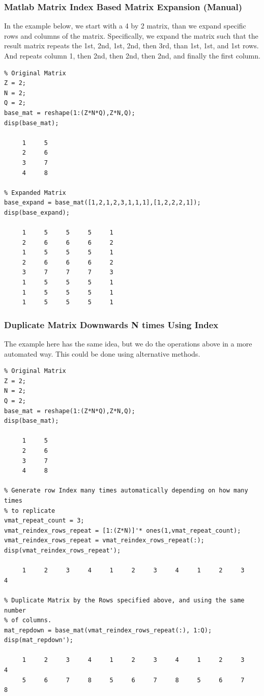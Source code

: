 \documentclass[
]{book}
\begin{document}
\hypertarget{matlab-matrix-index-based-matrix-expansion-manual}{%
\subsubsection{Matlab Matrix Index Based Matrix Expansion (Manual)}\label{matlab-matrix-index-based-matrix-expansion-manual}}

In the example below, we start with a 4 by 2 matrix, than we expand
specific rows and columns of the matrix. Specifically, we expand the
matrix such that the result matrix repeats the 1st, 2nd, 1st, 2nd, then
3rd, than 1st, 1st, and 1st rows. And repeats column 1, then 2nd, then
2nd, then 2nd, and finally the first column.

\begin{verbatim}
% Original Matrix
Z = 2;
N = 2;
Q = 2;
base_mat = reshape(1:(Z*N*Q),Z*N,Q);
disp(base_mat);

     1     5
     2     6
     3     7
     4     8

% Expanded Matrix
base_expand = base_mat([1,2,1,2,3,1,1,1],[1,2,2,2,1]);
disp(base_expand);

     1     5     5     5     1
     2     6     6     6     2
     1     5     5     5     1
     2     6     6     6     2
     3     7     7     7     3
     1     5     5     5     1
     1     5     5     5     1
     1     5     5     5     1
\end{verbatim}

\hypertarget{duplicate-matrix-downwards-n-times-using-index}{%
\subsubsection{Duplicate Matrix Downwards N times Using Index}\label{duplicate-matrix-downwards-n-times-using-index}}

The example here has the same idea, but we do the operations above in a
more automated way. This could be done using alternative methods.

\begin{verbatim}
% Original Matrix
Z = 2;
N = 2;
Q = 2;
base_mat = reshape(1:(Z*N*Q),Z*N,Q);
disp(base_mat);

     1     5
     2     6
     3     7
     4     8

% Generate row Index many times automatically depending on how many times
% to replicate
vmat_repeat_count = 3;
vmat_reindex_rows_repeat = [1:(Z*N)]'* ones(1,vmat_repeat_count);
vmat_reindex_rows_repeat = vmat_reindex_rows_repeat(:);
disp(vmat_reindex_rows_repeat');

     1     2     3     4     1     2     3     4     1     2     3     4

% Duplicate Matrix by the Rows specified above, and using the same number
% of columns.
mat_repdown = base_mat(vmat_reindex_rows_repeat(:), 1:Q);
disp(mat_repdown');

     1     2     3     4     1     2     3     4     1     2     3     4
     5     6     7     8     5     6     7     8     5     6     7     8
\end{verbatim}
\end{document}

